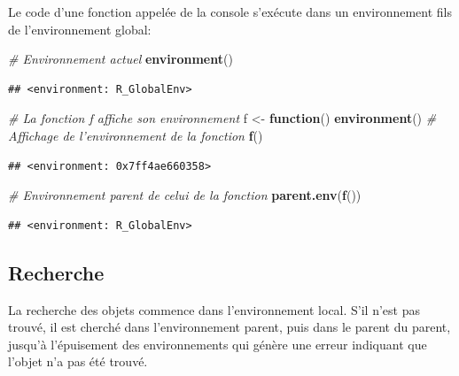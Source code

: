 \documentclass[
  12pt,
  french,
  a4paper,
  extrafontsizes,onecolumn,openright
  ]{memoir}
\newenvironment{Shaded}{\begin{snugshade}}{\end{snugshade}}
\newcommand{\CommentTok}[1]{\textcolor[rgb]{0.56,0.35,0.01}{\textit{#1}}}
\newcommand{\ControlFlowTok}[1]{\textcolor[rgb]{0.13,0.29,0.53}{\textbf{#1}}}
\newcommand{\KeywordTok}[1]{\textcolor[rgb]{0.13,0.29,0.53}{\textbf{#1}}}
\newcommand{\NormalTok}[1]{#1}
\newcommand{\StringTok}[1]{\textcolor[rgb]{0.31,0.60,0.02}{#1}}
\begin{document}
\normalsize

Le code d'une fonction appelée de la console s'exécute dans un environnement fils de l'environnement global:

\scriptsize

\begin{Shaded}
\begin{Highlighting}[]
\CommentTok{# Environnement actuel}
\KeywordTok{environment}\NormalTok{()}
\end{Highlighting}
\end{Shaded}

\begin{verbatim}
## <environment: R_GlobalEnv>
\end{verbatim}

\begin{Shaded}
\begin{Highlighting}[]
\CommentTok{# La fonction f affiche son environnement}
\NormalTok{f <-}\StringTok{ }\ControlFlowTok{function}\NormalTok{() }\KeywordTok{environment}\NormalTok{()}
\CommentTok{# Affichage de l'environnement de la fonction}
\KeywordTok{f}\NormalTok{()}
\end{Highlighting}
\end{Shaded}

\begin{verbatim}
## <environment: 0x7ff4ae660358>
\end{verbatim}

\begin{Shaded}
\begin{Highlighting}[]
\CommentTok{# Environnement parent de celui de la fonction}
\KeywordTok{parent.env}\NormalTok{(}\KeywordTok{f}\NormalTok{())}
\end{Highlighting}
\end{Shaded}

\begin{verbatim}
## <environment: R_GlobalEnv>
\end{verbatim}

\normalsize

\hypertarget{recherche}{%
\subsection{Recherche}\label{recherche}}

La recherche des objets commence dans l'environnement local.
S'il n'est pas trouvé, il est cherché dans l'environnement parent, puis dans le parent du parent, jusqu'à l'épuisement des environnements qui génère une erreur indiquant que l'objet n'a pas été trouvé.
\end{document}
